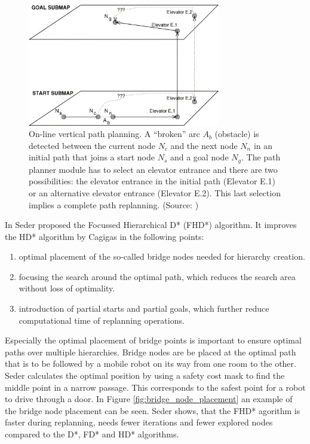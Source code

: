 \begin{figure}[h]
    \centering
    \includegraphics[width=0.75\textwidth]{figures/20_state_of_the_art/elevator_selection_problem.jpg}
    \caption[The elevator selection problem]{On-line vertical path planning. A “broken” arc \(A_b\) (obstacle) is detected between the current node \(N_c\) and the next node \(N_n\) in an initial path that joins a start node \(N_s\) and a goal node \(N_g\). The path planner module has to select an elevator entrance and there are two possibilities: the elevator entrance in the initial path (Elevator E.1) or an alternative elevator entrance (Elevator E.2). This last selection implies a complete path replanning. (Source: \cite{cagigas_hierarchical_2005})}
    \label{fig:elevator_selection_problem}
\end{figure}


In \cite{seder_hierarchical_2011} Seder proposed the Focussed Hierarchical D* (FHD*) algorithm. It improves the HD* algorithm by Cagigas in the following points:
\begin{enumerate}
    \item optimal placement of the so-called bridge nodes needed for hierarchy creation.
    \item focusing the search around the optimal path, which reduces the search area without loss of optimality.
    \item introduction of partial starts and partial goals, which further reduce computational time of replanning operations.
\end{enumerate}

Especially the optimal placement of bridge points is important to ensure optimal paths over multiple hierarchies. Bridge nodes are be placed at the optimal path that is to be followed by a mobile robot on its way from one room to the other. Seder calculates the optimal position by using a safety cost mask to find the middle point in a narrow passage. This corresponds to the safest point for a robot to drive through a door. In Figure \ref{fig:bridge_node_placement} an example of the bridge node placement can be seen. Seder shows, that the FHD* agorithm is faster during replanning, needs fewer iterations and fewer explored nodes compared to the D*, FD* and HD* algorithms.

